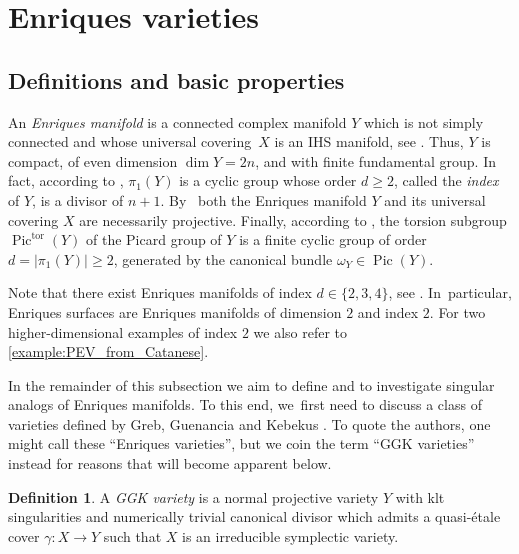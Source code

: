 \documentclass[JEP,XML,SOM,Unicode,published]{cedram}
\theoremstyle{plain}
\theoremstyle{definition}
\newtheorem{dfn}[thm]{Definition}
\DeclareMathOperator{\Pic}{Pic}
\begin{document}
\section{Enriques varieties}
\label{section:Enriques_varieties}

\subsection{Definitions and basic properties}
\label{subsection:def_Enriques}

An \emph{Enriques manifold} is a connected complex manifold $Y$ which is not simply connected and whose universal covering~$X$ is an IHS manifold, see \cite[Def.\,2.1]{OS11a}. Thus, $Y$ is compact, of even dimension \hbox{$\dim Y = 2n$}, and with finite fundamental group.
In fact, according to \cite[Prop.\,2.4]{OS11a}, $\pi_1(Y)$ is a cyclic group whose order $d \geq 2$, called the \emph{index} of $Y$, is a divisor of $n+1$. By~\cite[Cor.\,2.7]{OS11a} both the Enriques manifold $Y$ and its universal covering $X$ are necessarily projective. Finally, according to \cite[Prop.\,2.8]{OS11a}, the torsion subgroup $\Pic^{\text{tor}}(Y)$ of the Picard group of $Y$ is a finite cyclic group of order $d = |\pi_1(Y)| \geq 2$, generated by the canonical bundle $\omega_Y \in \Pic(Y)$.

Note that there exist Enriques manifolds of index $d \in \{2, 3, 4\}$, see \cite{BNWS11,OS11a}. In~particular, Enriques surfaces are Enriques manifolds of dimension $2$ and index $2$. For two higher-dimensional examples of index $2$ we also refer to \autoref{example:PEV_from_Catanese}.

In the remainder of this subsection we aim to define and to investigate singular analogs of Enriques manifolds. To this end, we~first need to discuss a class of varieties defined by Greb, Guenancia and Kebekus \cite[Rem.\,13.5]{GGK19}. To quote the authors, one might call these \enquote{Enriques varieties}, but we coin the term \enquote{GGK varieties} instead for reasons that will become apparent below.


\begin{dfn}
\label{dfn:GGK_variety}
A \emph{GGK variety} is a normal projective variety $Y$ with klt singularities and numerically trivial canonical divisor which admits a quasi-étale cover $\gamma \colon X \to Y$ such that $X$ is an irreducible symplectic variety.
\end{dfn}
\end{document}
